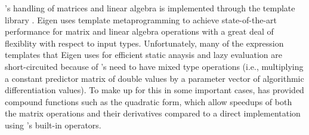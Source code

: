 \documentclass[article]{jss}
\begin{document}
's handling of matrices and linear algebra is
implemented through the   template library
\citep{Eigen:2012}.  Eigen uses template metaprogramming to achieve
state-of-the-art performance for matrix and linear algebra operations
with a great deal of flexiblity with respect to input types.
Unfortunately, many of the expression templates that Eigen uses for
efficient static anaysis and lazy evaluation are short-circuited
because of 's need to have mixed type operations (i.e.,
multiplying a constant predictor matrix of double values by a
parameter vector of algorithmic differentiation values).  To make up for
this in some important cases,  has provided compound
functions such as the quadratic form, which allow speedups of both the
matrix operations and their derivatives compared to a direct
implementation using 's built-in operators.









\nocite{R:2013}
\clearpage

\end{document}
